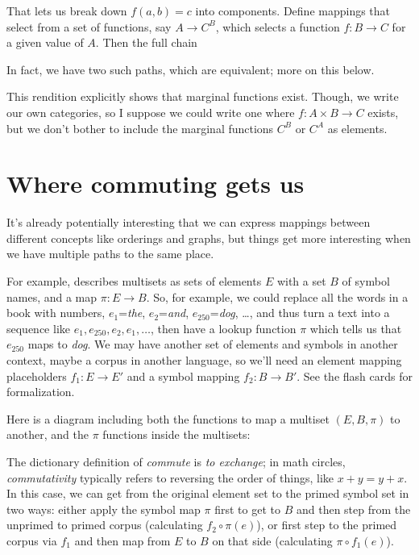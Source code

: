 \documentclass[11pt]{article}
\begin{document}
That lets us break down $f(a,b)=c$ into components.
Define mappings that select from a set of functions, say $A\to C^B$,
which selects a function $f:B\to C$ for a given value of $A$. Then the full chain

In fact, we have two such paths, which are equivalent; more on this below.


This rendition explicitly shows that marginal functions exist. Though, we write
our own categories, so I suppose we could write one where $f:A\times B\to C$ exists,
but we don't bother to include the marginal functions $C^B$ or $C^A$ as elements.


\section{Where commuting gets us} It's already potentially interesting that we can
express mappings between different concepts like orderings and graphs, but things get more
interesting when we have multiple paths to the same place.

For example,
\citet{spivak:category} describes multisets as sets of elements $E$ with a set $B$ of
symbol names, and a map $\pi:E\to B$. So, for example, we could replace all the words in a
book with numbers, $e_1$={\em the}, $e_2$={\em and}, $e_{250}$={\em dog}, \dots, and thus
turn a text into a sequence like $e_1, e_{250}, e_2, e_1, \dots$, then have a lookup
function $\pi$ which tells us that $e_{250}$ maps to {\em dog}. We
may have another set of elements and symbols in another context, maybe a corpus in
another language, so we'll need an element mapping placeholders $f_1:E\to E'$ and a symbol mapping
$f_2:B\to B'$. See the flash cards for formalization.

Here is a diagram including both
 the functions to map a multiset $(E, B, \pi)$ to another, and
the $\pi$ functions inside the multisets:

The dictionary definition of {\em
commute} is {\em to exchange}; in math circles, {\em commutativity} typically refers to
reversing the order of things, like $x+y = y+x$. In this case, we can 
get from the original element set to the primed symbol set in two ways:
either apply the symbol map $\pi$ first to get to $B$ and then step from the unprimed to
primed corpus (calculating $f_2\circ\pi(e)$), or first step to the primed corpus via $f_1$ and then
map from $E$ to $B$ on that side (calculating $\pi\circ f_1(e)$).
\end{document}
